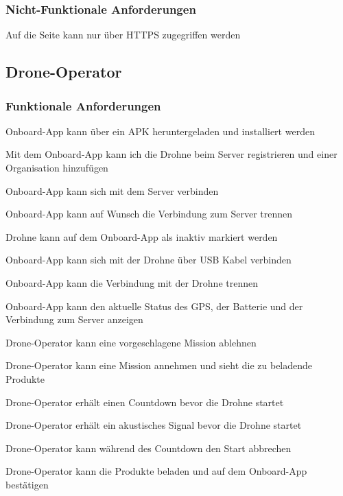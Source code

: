 \subsubsection{Nicht-Funktionale Anforderungen}
\begin{todolist}
	\item[\done] Auf die Seite kann nur über HTTPS zugegriffen werden
\end{todolist}


\subsection{Drone-Operator}
\subsubsection{Funktionale Anforderungen}
\begin{todolist}
	\item[\done] Onboard-App kann über ein APK heruntergeladen und installiert werden
	\item[\done] Mit dem Onboard-App kann ich die Drohne beim Server registrieren und einer Organisation hinzufügen
	\item[\done] Onboard-App kann sich mit dem Server verbinden
	\item[\done] Onboard-App kann auf Wunsch die Verbindung zum Server trennen
	\item[\done] Drohne kann auf dem Onboard-App als inaktiv markiert werden
	\item[\done] Onboard-App kann sich mit der Drohne über USB Kabel verbinden
	\item[\done] Onboard-App kann die Verbindung mit der Drohne trennen
	\item[\done] Onboard-App kann den aktuelle Status des GPS, der Batterie und der Verbindung zum Server anzeigen
	\item[\done] Drone-Operator kann eine vorgeschlagene Mission ablehnen
	\item[\done] Drone-Operator kann eine Mission annehmen und sieht die zu beladende Produkte
	\item[\done] Drone-Operator erhält einen Countdown bevor die Drohne startet
	\item[\done] Drone-Operator erhält ein akustisches Signal bevor die Drohne startet
	\item[\done] Drone-Operator kann während des Countdown den Start abbrechen
	\item[\done] Drone-Operator kann die Produkte beladen und auf dem Onboard-App bestätigen
\end{todolist}


